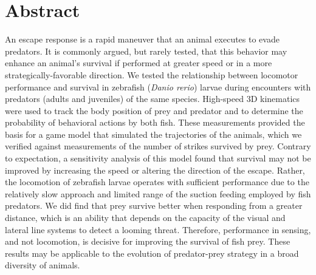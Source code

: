 \documentclass[]{rsos}%
\begin{document}
\section*{Abstract}
An escape response is a rapid maneuver that an animal executes to evade predators. 
It is commonly argued, but rarely tested, that this behavior may enhance an animal's survival if performed at greater speed or in a more strategically-favorable direction.
We tested the relationship between locomotor performance and survival in zebrafish (\textit{Danio rerio}) larvae during encounters with predators (adults and juveniles) of the same species.
High-speed 3D kinematics were used to track the body position of prey and predator and to determine the probability of behavioral actions by both fish.
These measurements provided the basis for a game model that simulated the trajectories of the animals, which we verified against measurements of the number of strikes survived by prey.
Contrary to expectation, a sensitivity analysis of this model found that survival may not be improved by increasing the speed or altering the direction of the escape.
Rather, the locomotion of zebrafish larvae operates with sufficient performance due to the relatively slow approach and limited range of the suction feeding employed by fish predators.
We did find that prey survive better when responding from a greater distance, which is an ability that depends on the capacity of the visual and lateral line systems to detect a looming threat.
Therefore, performance in sensing, and not locomotion, is decisive for improving the survival of fish prey.
These results may be applicable to the evolution of predator-prey strategy in a broad diversity of animals.
\end{document}
